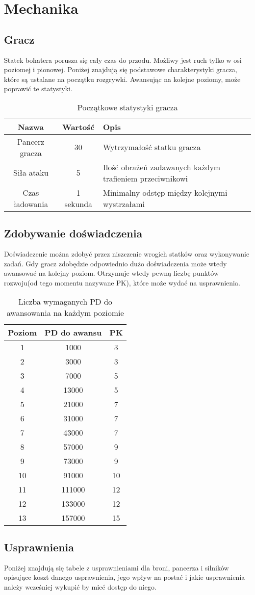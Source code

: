 \chapter{Mechanika}

\section{Gracz}
Statek bohatera porusza się cały czas do przodu. Możliwy jest ruch tylko w osi poziomej i pionowej.
Poniżej znajdują się podstawowe charakterystyki gracza, które są ustalane na początku rozgrywki. Awansując na kolejne poziomy, może poprawić te statystyki.

\begin{table}[h]
\centering
\begin{tabular}{ | c | c | p{6cm} | }
\hline
\textbf{Nazwa} & \textbf{Wartość} & \textbf{Opis} \\ \hline
Pancerz gracza & 30 & Wytrzymałość statku gracza \\ \hline
Siła ataku & 5 & Ilość obrażeń zadawanych każdym trafieniem przeciwnikowi\\ \hline
Czas ładowania & 1 sekunda & Minimalny odstęp między kolejnymi wystrzałami\\ \hline
\end{tabular}
\caption{Początkowe statystyki gracza}
\end{table}

\section{Zdobywanie doświadczenia}
Doświadczenie można zdobyć przez niszczenie wrogich statków oraz wykonywanie zadań. Gdy gracz zdobędzie odpowiednio dużo doświadczenia może wtedy awansować na kolejny poziom. Otrzymuje wtedy pewną liczbę punktów rozwoju(od tego momentu nazywane PK), które może wydać na usprawnienia.

\begin{table}[h]
\centering
\begin{tabular}{ | c | c | c | }
\hline
\textbf{Poziom} & \textbf{PD do awansu} & \textbf{PK} \\
\hline
1 & 1000 & 3 \\
2 & 3000 & 3 \\
3 & 7000 & 5 \\
4 & 13000 & 5 \\
5 & 21000 & 7 \\
6 & 31000 & 7 \\
7 & 43000 & 7 \\
8 & 57000 & 9 \\
9 & 73000 & 9 \\
10 & 91000 & 10 \\
11 & 111000 & 12 \\
12 & 133000 & 12 \\
13 & 157000 & 15 \\
\hline

\end{tabular}
\caption{Liczba wymaganych PD do awansowania na każdym poziomie}
\end{table}

\section{Usprawnienia}
Poniżej znajdują się tabele z usprawnieniami dla broni, pancerza i silników opisujące koszt danego usprawnienia, jego wpływ na postać i jakie usprawnienia należy wcześniej wykupić by mieć dostęp do niego.